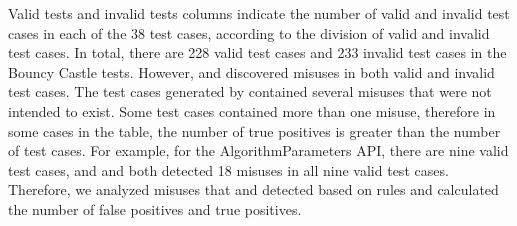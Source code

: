 Valid tests and invalid tests columns indicate the number of valid and invalid test cases in each of the 38 test cases, according to the \cognicrypttestgen{} division of valid and invalid test cases. In total, there are 228 valid test cases and 233 invalid test cases in the Bouncy Castle tests. However, \codyze{} and \cognicryptsast{} discovered misuses in both valid and invalid test cases. The test cases generated by \cognicrypttestgen{} contained several misuses that were not intended to exist. Some test cases contained more than one misuse, therefore in some cases in the table, the number of true positives is greater than the number of test cases. For example, for the AlgorithmParameters API, there are nine valid test cases, and \codyze{} and \cognicryptsast{} both detected 18 misuses in all nine valid test cases. Therefore, we analyzed misuses that \codyze{} and \cognicryptsast{} detected based on \crysl{} rules and calculated the number of false positives and true positives.



